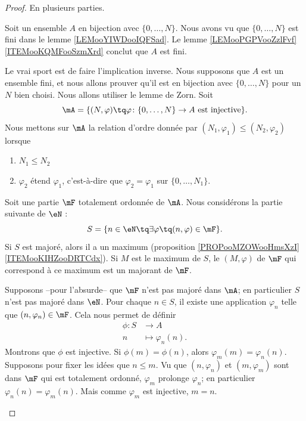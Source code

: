 \begin{proof}
	En plusieurs parties.
	\begin{subproof}
		\spitem[\ref{ITEMooMNMTooEOIjdo}, \( \Leftarrow\)]
		Soit un ensemble \( A\) en bijection avec \( \{ 0,\ldots, N \}\). Nous avons vu que \( \{ 0,\ldots, N \}\) est fini dans le lemme \ref{LEMooYIWDooIQFSad}. Le lemme \ref{LEMooPGPVooZzlFvf}\ref{ITEMooKQMFooSzmXrd} conclut que \( A\) est fini.

		\spitem[\ref{ITEMooMNMTooEOIjdo}, \( \Rightarrow\)]
		Le vrai sport est de faire l'implication inverse. Nous supposons que \( A\) est un ensemble fini, et nous allons prouver qu'il est en bijection avec \( \{ 0,\ldots, N \}\) pour un \( N\) bien choisi. Nous allons utiliser le lemme de Zorn. Soit
		\begin{equation}
			\mA=\{ (N,\varphi)\tq  \varphi\colon \{ 0,\ldots, N \}\to A\text{ est injective} \}.
		\end{equation}
		Nous mettons sur \( \mA\) la relation d'ordre donnée par \( (N_1,\varphi_1)\leq (N_2,\varphi_2)\) lorsque
		\begin{enumerate}
			\item
			      \( N_1\leq N_2\)
			\item
			      \( \varphi_2\) étend \( \varphi_1\), c'est-à-dire que \( \varphi_2=\varphi_1\) sur \( \{ 0,\ldots, N_1 \}\).
		\end{enumerate}
		\begin{subproof}
			Soit une partie \( \mF\) totalement ordonnée de \( \mA\). Nous considérons la partie suivante de \( \eN\) :
			\begin{equation}
				S=\{ n\in \eN\tq \exists  \varphi \tq (n,\varphi)\in \mF \}.
			\end{equation}
			Si \( S\) est majoré, alors il a un maximum (proposition \ref{PROPooMZOWooHmsXzI}\ref{ITEMooKIHZooDRTCdx}). Si \( M\) est le maximum de \( S\), le \( (M,\varphi)\) de \( \mF\) qui correspond à ce maximum est un majorant de \( \mF\).

			Supposons --pour l'absurde-- que \( \mF\) n'est pas majoré dans \( \mA\); en particulier \( S\) n'est pas majoré dans \( \eN\). Pour chaque \( n\in S\), il existe une application \( \varphi_n\) telle que \( (n,\varphi_n)\in\mF\). Cela nous permet de définir
			\begin{equation}
				\begin{aligned}
					\phi\colon S & \to A                 \\
					n            & \mapsto \varphi_n(n).
				\end{aligned}
			\end{equation}
			Montrons que \( \phi\) est injective. Si \( \phi(m)=\phi(n)\), alors \( \varphi_m(m)=\varphi_n(n)\). Supposons pour fixer les idées que \( n\leq m\). Vu que \( (n,\varphi_n)\) et \( (m,\varphi_m)\) sont dans \( \mF\) qui est totalement ordonné, \( \varphi_m\) prolonge \( \varphi_n\); en particulier \( \varphi_n(n)=\varphi_m(n)\). Mais comme \( \varphi_m\) est injective, \( m=n\).


\end{subproof}
\end{subproof}
\end{proof}
